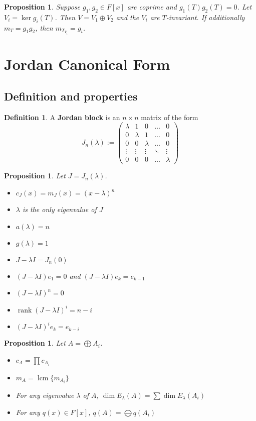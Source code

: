 \documentclass[12pt]{article}
\newtheorem{prop}[thm]{Proposition}
\theoremstyle{definition}
\newtheorem*{defn*}{Definition}
\DeclareMathOperator{\rank}{rank}
\DeclareMathOperator{\lcm}{lcm}
\begin{document}
\begin{prop}
	Suppose $g_1, g_2 \in F[x]$ are coprime and $g_1(T)g_2(T) = 0$.
	Let $V_i = \ker{g_i(T)}$.
	Then $V = V_1 \oplus V_2$ and the $V_i$ are $T$-invariant.
	If additionally $m_T = g_1g_2$, then $m_{T_{V_i}} = g_i$.
\end{prop}

\section{Jordan Canonical Form}

\subsection{Definition and properties}

\begin{defn*}
	A \textbf{Jordan block} is an $n \times n$ matrix of the form
	$$J_n(\lambda) := \begin{pmatrix}
		\lambda & 1 & 0 & \ldots & 0 \\
		0 & \lambda & 1 & \ldots & 0 \\
		0 & 0 & \lambda & \ldots & 0 \\
		\vdots & \vdots & \vdots & \ddots & \vdots \\
		0 & 0 & 0 & \ldots & \lambda
	\end{pmatrix}$$
\end{defn*}

\begin{prop}
	Let $J = J_n(\lambda)$.
	\begin{itemize}
		\item $c_J(x) = m_J(x) = (x - \lambda)^n$
		\item $\lambda$ is the only eigenvalue of $J$
		\item $a(\lambda) = n$
		\item $g(\lambda) = 1$
		\item $J - \lambda I = J_n(0)$
		\item $(J - \lambda I)e_1 = 0$ and $(J - \lambda I)e_k = e_{k - 1}$
		\item $(J - \lambda I)^n = 0$
		\item $\rank{(J - \lambda I)^i} = n - i$
		\item $(J - \lambda I)^ie_k = e_{k - i}$
	\end{itemize}
\end{prop}

\begin{prop}
	Let $A = \bigoplus A_i$.
	\begin{itemize}
		\item $c_A = \prod c_{A_i}$
		\item $m_A = \lcm{\{m_{A_i}\}}$
		\item For any eigenvalue $\lambda$ of $A$, $\dim{E_{\lambda}(A)} = \sum \dim{E_{\lambda}(A_i)}$
		\item For any $q(x) \in F[x]$, $q(A) = \bigoplus q(A_i)$
	\end{itemize}
\end{prop}
\end{document}
